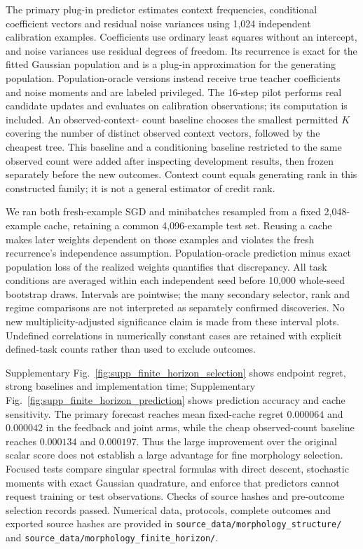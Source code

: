The primary plug-in predictor estimates context frequencies, conditional
coefficient vectors and residual noise variances using 1,024 independent
calibration examples. Coefficients use ordinary least squares without an
intercept, and noise variances use residual degrees of freedom. Its recurrence
is exact for the fitted Gaussian population and is a plug-in approximation
for the generating population. Population-oracle versions instead receive
true teacher coefficients and noise moments and are labeled privileged.
The 16-step pilot performs real candidate updates and evaluates on
calibration observations; its computation is included. An observed-context-
count baseline chooses the smallest permitted $K$ covering the number of
distinct observed context vectors, followed by the cheapest tree. This baseline and a conditioning baseline restricted to the same observed
count were added after inspecting development results, then frozen
separately before the new outcomes. Context count equals generating
rank in this constructed family; it is not a general estimator of credit rank.

We ran both fresh-example SGD and minibatches resampled from a fixed
2,048-example cache, retaining a common 4,096-example test set. Reusing a
cache makes later weights dependent on those examples and violates the fresh
recurrence's independence assumption. Population-oracle prediction minus
exact population loss of the realized weights quantifies that discrepancy.
All task conditions are averaged within each independent seed before 10,000
whole-seed bootstrap draws. Intervals are pointwise; the many secondary
selector, rank and regime comparisons are not interpreted as separately
confirmed discoveries. No new multiplicity-adjusted significance claim is
made from these interval plots. Undefined correlations in numerically
constant cases are retained with explicit defined-task counts rather than
used to exclude outcomes.

Supplementary Fig.~\ref{fig:supp_finite_horizon_selection} shows endpoint
regret, strong baselines and implementation time;
Supplementary Fig.~\ref{fig:supp_finite_horizon_prediction} shows prediction
accuracy and cache sensitivity. The primary forecast reaches mean fixed-cache
regret $0.000064$ and $0.000042$ in the feedback and joint arms, while the
cheap observed-count baseline reaches $0.000134$ and $0.000197$. Thus the
large improvement over the original scalar score does not establish a large
advantage for fine morphology selection. Focused tests compare singular
spectral formulas with direct descent, stochastic moments with exact Gaussian
quadrature, and enforce that predictors cannot request training or test
observations. Checks of source hashes and pre-outcome selection records passed. Numerical data,
protocols, complete outcomes and exported source hashes are provided in
\texttt{source\_data/morphology\_structure/} and
\texttt{source\_data/morphology\_finite\_horizon/}.
